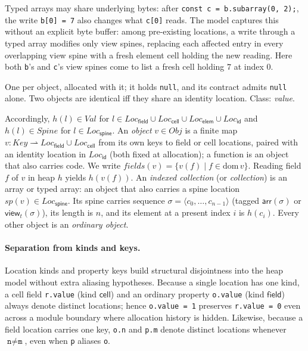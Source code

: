 \documentclass[10pt,a4paper]{article}
\theoremstyle{definition}
\theoremstyle{remark}
\newcommand{\code}[1]{\texttt{#1}}
\newcommand{\kF}{\mathsf{field}}\newcommand{\kC}{\mathsf{cell}}\newcommand{\kE}{\mathsf{elem}}\newcommand{\kS}{\mathsf{spine}}\newcommand{\kI}{\mathsf{id}}
\newcommand{\LF}{\mathit{Loc}_{\kF}}\newcommand{\LC}{\mathit{Loc}_{\kC}}\newcommand{\LE}{\mathit{Loc}_{\kE}}\newcommand{\LS}{\mathit{Loc}_{\kS}}\newcommand{\LI}{\mathit{Loc}_{\kI}}
\begin{document}
\begin{description}[leftmargin=1.5em,style=nextline]
Typed arrays may share underlying bytes: after
\code{const c = b.subarray(0, 2);}, the write \code{b[0] = 7} also
changes what \code{c[0]} reads. The model captures this without an
explicit byte buffer: among pre-existing locations, a write through a
typed array modifies only view spines, replacing each affected entry in
every overlapping view spine with a fresh element cell holding the new
reading. Here both \code{b}'s and \code{c}'s view spines come to list a
fresh cell holding $7$ at index $0$.
\item[Identity location, kind $\kI$] One per object, allocated with it;
it holds \code{null}, and its contract admits \code{null} alone. Two
objects are identical iff they share an identity location. Class:
\emph{value}.
\end{description}

\noindent
Accordingly, $h(l)\in\mathit{Val}$ for
$l\in\LF\cup\LC\cup\LE\cup\LI$ and $h(l)\in\mathit{Spine}$ for
$l\in\LS$. An \emph{object} $v\in\mathit{Obj}$ is a finite map
$v:\mathit{Key}\rightharpoonup\LF\cup\LC$ from its own keys to field or
cell locations, paired with an identity location in $\LI$ (both fixed at
allocation); a function is an object that also carries code. We write
$\mathit{fields}(v)=\{v(f)\mid f\in\mathrm{dom}\,v\}$. Reading field $f$
of $v$ in heap $h$ yields $h(v(f))$. An \emph{indexed collection} (or
\emph{collection}) is an array or typed array: an object that also
carries a spine location $\mathit{sp}(v)\in\LS$. Its spine carries sequence
$\sigma=\langle c_0,\dots,c_{n-1}\rangle$ (tagged $\mathsf{arr}(\sigma)$ or
$\mathsf{view}_t(\sigma)$), its length is $n$,
and its element at a present index $i$ is $h(c_i)$. Every other object
is an \emph{ordinary object}.

\paragraph{Separation from kinds and keys.}
Location kinds and property keys build structural disjointness into the
heap model without extra aliasing hypotheses. Because a single location
has one kind, a cell field \code{r.value} (kind $\kC$) and an ordinary
property \code{o.value} (kind $\kF$) always denote distinct locations;
hence \code{o.value = 1} preserves \code{r.value = 0} even across a
module boundary where allocation history is hidden. Likewise, because a
field location carries one key, \code{o.n} and \code{p.m} denote
distinct locations whenever $\code{n}\ne\code{m}$, even when \code{p}
aliases \code{o}.
\end{document}
